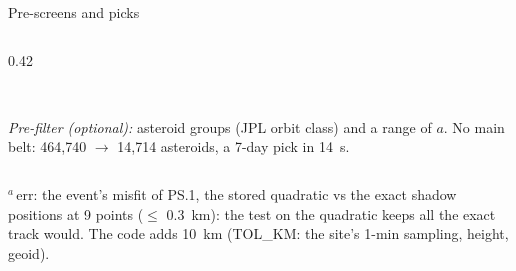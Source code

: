 \begin{frame}{Pre-screens and picks}
\begin{columns}[c]
\begin{column}{0.42\textwidth}
\\[0.8ex]
      \raggedright
      {\scriptsize\textcolor{syzaccent}{\textit{Pre-filter (optional):}} asteroid groups (JPL orbit class) and a
      range of $a$. No main belt: 464{,}740 $\to$ 14{,}714 asteroids, a 7-day pick in \SI{14}{s}.\par}
    \end{column}
  \end{columns}
  {\tiny $^{a}$\,err: the event's misfit of PS.1, the stored quadratic vs the exact shadow positions at 9 points
  ($\le$ \SI{0.3}{km}): the test on the quadratic keeps all the exact track would. The code adds \SI{10}{km} (TOL\_KM:
  the site's 1-min sampling, height, geoid).\par}
\end{frame}

